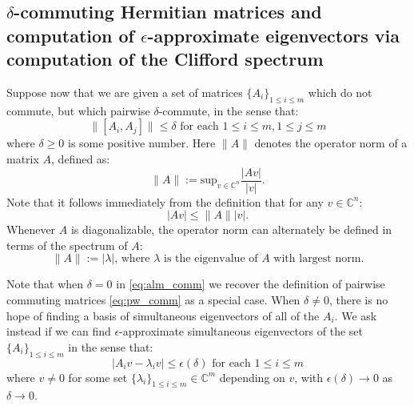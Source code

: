 \documentclass[a4paper]{article}
\begin{document}
\subsection{$\delta$-commuting Hermitian matrices and computation of $\epsilon$-approximate eigenvectors via computation of the Clifford spectrum} \label{sec:spec_app}

Suppose now that we are given a set of matrices $\{ A_i \}_{1 \leq i \leq m}$ which {do not commute}, but which {pairwise $\delta$-commute}, in the sense that: 
\begin{equation} \label{eq:alm_comm}
	\| [A_i,A_j] \| \leq \delta \text{ for each } 1 \leq i \leq m, 1 \leq j \leq m	
\end{equation}
where $\delta \geq 0$ is some positive number. Here $\| A \|$ denotes the {operator norm} of a matrix $A$, defined as:
\begin{equation}
	\| A \| := \text{sup}_{v \in \mathbb{C}^n} \frac{ | A v | }{ | v | }.
\end{equation}
Note that it follows immediately from the definition that for any $v \in \mathbb{C}^n$:
\begin{equation}
	| A v | \leq \| A \| | v |.
\end{equation}
Whenever $A$ is diagonalizable, the operator norm can alternately be defined in terms of the spectrum of $A$: 
\begin{equation}
	\| A \| := \text{$|\lambda|$, where $\lambda$ is the eigenvalue of $A$ with largest norm.}
\end{equation}

Note that when $\delta = 0$ in \eqref{eq:alm_comm} we recover the definition of pairwise commuting matrices \eqref{eq:pw_comm} as a special case. When $\delta \neq 0$, there is no hope of finding a basis of simultaneous eigenvectors of all of the $A_i$. We ask instead if we can find {$\epsilon$-approximate simultaneous eigenvectors} of the set $\{A_i\}_{1 \leq i \leq m}$ in the sense that: 
\begin{equation} \label{eq:app_evec}
	| A_i v - \lambda_i v | \leq \epsilon(\delta) \text{ for each } 1 \leq i \leq m
\end{equation}
where $v \neq 0$ for some set $\{\lambda_i\}_{1 \leq i \leq m} \in \mathbb{C}^m$ depending on $v$, with $\epsilon(\delta) \rightarrow 0$ as $\delta \rightarrow 0$. 
\end{document}
